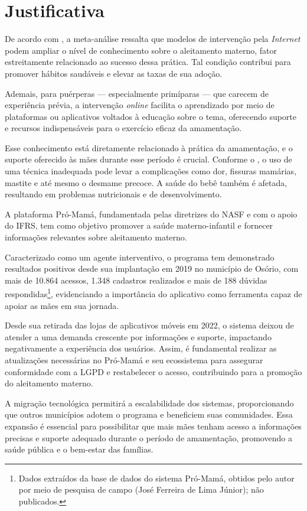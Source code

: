 \section{Justificativa}

De acordo com , a meta-análise ressalta que modelos de intervenção pela \emph{Internet} podem ampliar o nível de conhecimento sobre o aleitamento materno, fator estreitamente relacionado ao sucesso dessa prática. Tal condição contribui para promover hábitos saudáveis e elevar as taxas de sua adoção.

Ademais, para puérperas — especialmente primíparas — que carecem de experiência prévia, a intervenção \emph{online} facilita o aprendizado por meio de plataformas ou aplicativos voltados à educação sobre o tema, oferecendo suporte e recursos indispensáveis para o exercício eficaz da amamentação.

Esse conhecimento está diretamente relacionado à prática da amamentação, e o suporte oferecido às mães durante esse período é crucial. Conforme o , o uso de uma técnica inadequada pode levar a complicações como dor, fissuras mamárias, mastite e até mesmo o desmame precoce. A saúde do bebê também é afetada, resultando em problemas nutricionais e de desenvolvimento.

A plataforma Pró-Mamá, fundamentada pelas diretrizes do NASF e com o apoio do IFRS, tem como objetivo promover a saúde materno-infantil e fornecer informações relevantes sobre aleitamento materno. 

Caracterizado como um agente interventivo, o programa tem demonstrado resultados positivos desde sua implantação em 2019 no município de Osório, com mais de 10.864 acessos, 1.348 cadastros realizados e mais de 188 dúvidas respondidas\footnote{Dados extraídos da base de dados do sistema Pró-Mamá, obtidos pelo autor por meio de pesquisa de campo (José Ferreira de Lima Júnior); não publicados.}, evidenciando a importância do aplicativo como ferramenta capaz de apoiar as mães em sua jornada.

Desde sua retirada das lojas de aplicativos móveis em 2022, o sistema deixou de atender a uma demanda crescente por informações e suporte, impactando negativamente a experiência dos usuários. Assim, é fundamental realizar as atualizações necessárias no Pró-Mamá e seu ecossistema para assegurar conformidade com a LGPD e restabelecer o acesso, contribuindo para a promoção do aleitamento materno.

A migração tecnológica permitirá a escalabilidade dos sistemas, proporcionando que outros municípios adotem o programa e beneficiem suas comunidades. Essa expansão é essencial para possibilitar que mais mães tenham acesso a informações precisas e suporte adequado durante o período de amamentação, promovendo a saúde pública e o bem-estar das famílias.

